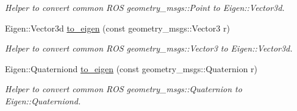 \begin{DoxyCompactItemize}
\begin{DoxyCompactList}\small\item\em Helper to convert common R\+OS geometry\+\_\+msgs\+::\+Point to Eigen\+::\+Vector3d. \end{DoxyCompactList}\item 
Eigen\+::\+Vector3d \mbox{\hyperlink{group__nodelib_gaa967b677c7a130cb95621988a4987fab}{to\+\_\+eigen}} (const geometry\+\_\+msgs\+::\+Vector3 r)
\begin{DoxyCompactList}\small\item\em Helper to convert common R\+OS geometry\+\_\+msgs\+::\+Vector3 to Eigen\+::\+Vector3d. \end{DoxyCompactList}\item 
Eigen\+::\+Quaterniond \mbox{\hyperlink{group__nodelib_gab3357177e153e9bc233d96ac595c6a5f}{to\+\_\+eigen}} (const geometry\+\_\+msgs\+::\+Quaternion r)
\begin{DoxyCompactList}\small\item\em Helper to convert common R\+OS geometry\+\_\+msgs\+::\+Quaternion to Eigen\+::\+Quaterniond. \end{DoxyCompactList}\end{DoxyCompactItemize}
